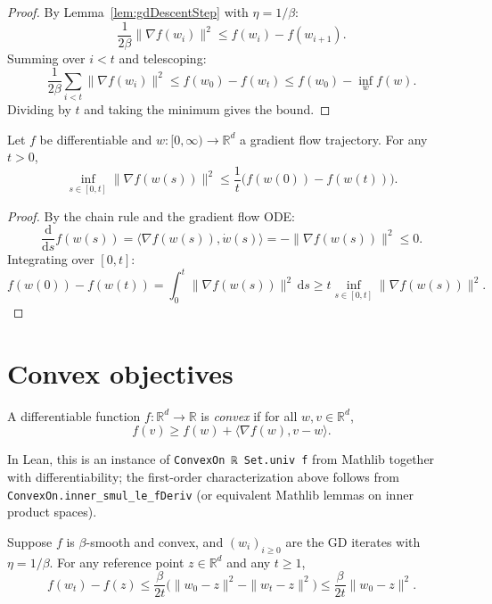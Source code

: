 \begin{proof}
By Lemma~\ref{lem:gdDescentStep} with $\eta = 1/\beta$:
\[
  \frac{1}{2\beta}\|\nabla f(w_i)\|^2 \le f(w_i) - f(w_{i+1}).
\]
Summing over $i < t$ and telescoping:
\[
  \frac{1}{2\beta}\sum_{i<t}\|\nabla f(w_i)\|^2 \le f(w_0) - f(w_t) \le f(w_0) - \inf_w f(w).
\]
Dividing by $t$ and taking the minimum gives the bound.
\end{proof}

\begin{theorem}\label{thm:gfStationary}
Let $f$ be differentiable and $w : [0, \infty) \to \mathbb{R}^d$ a gradient flow trajectory.
For any $t > 0$,
\[
  \inf_{s \in [0,t]} \|\nabla f(w(s))\|^2 \le \frac{1}{t}\bigl(f(w(0)) - f(w(t))\bigr).
\]
\end{theorem}

\begin{proof}
By the chain rule and the gradient flow ODE:
\[
  \frac{\mathrm{d}}{\mathrm{d}s} f(w(s)) = \langle \nabla f(w(s)), \dot{w}(s) \rangle = -\|\nabla f(w(s))\|^2 \le 0.
\]
Integrating over $[0,t]$:
\[
  f(w(0)) - f(w(t)) = \int_0^t \|\nabla f(w(s))\|^2 \, \mathrm{d}s \ge t \inf_{s \in [0,t]}\|\nabla f(w(s))\|^2.
\]
\end{proof}


\section{Convex objectives}
\label{sec:convexity}

\begin{definition}\label{def:convex}
  \leanok
A differentiable function $f : \mathbb{R}^d \to \mathbb{R}$ is \emph{convex} if for all $w, v \in \mathbb{R}^d$,
\[
  f(v) \ge f(w) + \langle \nabla f(w), v - w \rangle.
\]
\end{definition}

\begin{remark}
In Lean, this is an instance of \texttt{ConvexOn ℝ Set.univ f} from Mathlib together with differentiability; the first-order characterization above follows from \texttt{ConvexOn.inner\_smul\_le\_fDeriv} (or equivalent Mathlib lemmas on inner product spaces).
\end{remark}

\begin{theorem}\label{thm:gdConvex}
Suppose $f$ is $\beta$-smooth and convex, and $(w_i)_{i \ge 0}$ are the GD iterates with $\eta = 1/\beta$.
For any reference point $z \in \mathbb{R}^d$ and any $t \ge 1$,
\[
  f(w_t) - f(z) \le \frac{\beta}{2t}\bigl(\|w_0 - z\|^2 - \|w_t - z\|^2\bigr)
                  \le \frac{\beta}{2t}\|w_0 - z\|^2.
\]
\end{theorem}

